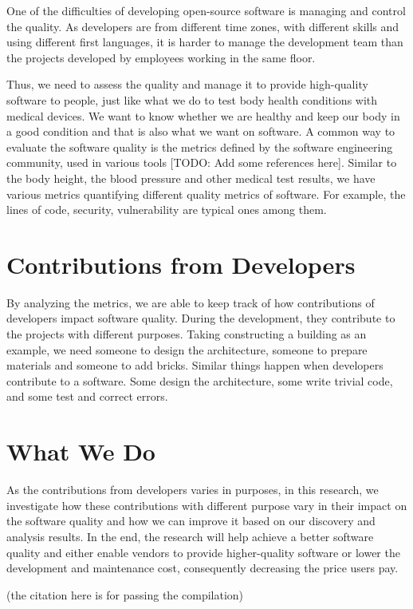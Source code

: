 \documentclass[10pt,conference]{IEEEtran}
\newcommand{\comment}[1]{{\leavevmode\color{comment}[TODO: #1]}\xspace}
\begin{document}
One of the difficulties of developing open-source software is managing and control the quality. 
As developers are from different time zones, with different skills and using different first languages, it is harder to manage the development team than the projects developed by employees working in the same floor.

Thus, we need to assess the quality and manage it to provide high-quality software to people, just like what we do to test body health conditions with medical devices.
We want to know whether we are healthy and keep our body in a good condition and that is also what we want on software.
A common way to evaluate the software quality is the metrics defined by the software engineering community, used in various tools \comment{Add some references here}.
Similar to the body height, the blood pressure and other medical test results, we have various metrics quantifying different quality metrics of software.
For example, the lines of code, security, vulnerability are typical ones among them.

\section{Contributions from Developers}

By analyzing the metrics, we are able to keep track of how contributions of developers impact software quality.
During the development, they contribute to the projects with different purposes.
Taking constructing a building as an example, we need someone to design the architecture, someone to prepare materials and someone to add bricks.
Similar things happen when developers contribute to a software.
Some design the architecture, some write trivial code, and some test and correct errors. 

\section{What We Do}

As the contributions from developers varies in purposes, in this research, we investigate how these contributions with different purpose vary in their impact on the software quality and how we can improve it based on our discovery and analysis results.
In the end, the research will help achieve a better software quality and either enable vendors to provide higher-quality software or lower the development and maintenance cost, consequently decreasing the price users pay. 


(the citation here is for passing the compilation)\cite{38631e0608b54d4299d5707f3a78debf}

\medskip



\vspace{12pt}
\color{red}
\end{document}
